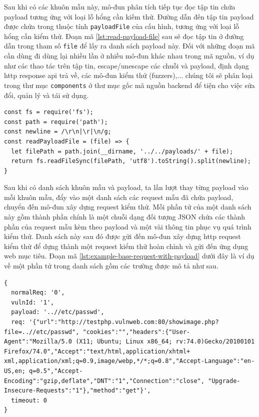 Sau khi có các khuôn mẫu này, mô-đun phân tích tiếp tục đọc tập tin chứa payload tương ứng với loại lỗ hổng cần kiếm thử. Đường dẫn đến tập tin payload được chứa trong thuộc tính \texttt{payloadFile} của cấu hình, tương ứng với loại lỗ hổng cần kiểm thử. Đoạn mã \ref{lst:read-payload-file} sau sẽ đọc tập tin ở đường dẫn trong tham số \texttt{file} để lấy ra danh sách payload này. Đối với những đoạn mã cần dùng đi dùng lại nhiều lần ở nhiều mô-đun khác nhau trong mã nguồn, ví dụ như các thao tác trên tập tin, escape/unescape các chuỗi và payload, định dạng \acrshort{http} response \acrshort{api} trả về, các mô-đun kiểm thử (fuzzers),... chúng tôi sẽ phân loại trong thư mục \texttt{components} ở thư mục gốc mã nguồn backend để tiện cho việc sửa đổi, quản lý và tái sử dụng.
\begin{lstlisting}[style=ES6, label={lst:read-payload-file}, caption={Đọc danh sách payload từ tập tin}]
const fs = require('fs');
const path = require('path');
const newline = /\r\n|\r|\n/g;
const readPayloadFile = (file) => {
  let filePath = path.join(__dirname, '../../payloads/' + file);
  return fs.readFileSync(filePath, 'utf8').toString().split(newline);
}
\end{lstlisting}
Sau khi có danh sách khuôn mẫu và payload, ta lần lượt thay từng payload vào mỗi khuôn mẫu, đẩy vào một danh sách các request mẫu đã chứa payload, chuyển đến mô-đun xây dựng request kiểm thử. Mỗi phần tử của một danh sách này gồm thành phần chính là một chuỗi dạng đối tượng JSON chứa các thành phần của request mẫu kèm theo payload và một vài thông tin phục vụ quá trình kiểm thử. Danh sách này sau đó được gửi đến mô-đun xây dựng \acrshort{http} request kiểm thử để dựng thành một request kiểm thử hoàn chỉnh và gửi đến ứng dụng web mục tiêu. Đoạn mã \ref{lst:example-base-request-with-payload} dưới đây là ví dụ về một phần tử trong danh sách gồm các trường được mô tả như sau.
\begin{lstlisting}[style=ES6, label={lst:example-base-request-with-payload}, caption={Ví dụ về một phần từ của danh sách request mẫu chứa payload}]
{
  normalReq: '0',
  vulnId: '1',
  payload: '..//etc/passwd',
  req: '{"url":"http://testphp.vulnweb.com:80/showimage.php?file=..//etc/passwd", "cookies":"","headers":{"User-Agent":"Mozilla/5.0 (X11; Ubuntu; Linux x86_64; rv:74.0)Gecko/20100101 Firefox/74.0","Accept":"text/html,application/xhtml+ xml,application/xml;q=0.9,image/webp,*/*;q=0.8","Accept-Language":"en-US,en; q=0.5","Accept-Encoding":"gzip,deflate","DNT":"1","Connection":"close", "Upgrade-Insecure-Requests":"1"},"method":"get"}',
  timeout: 0
}
\end{lstlisting}
